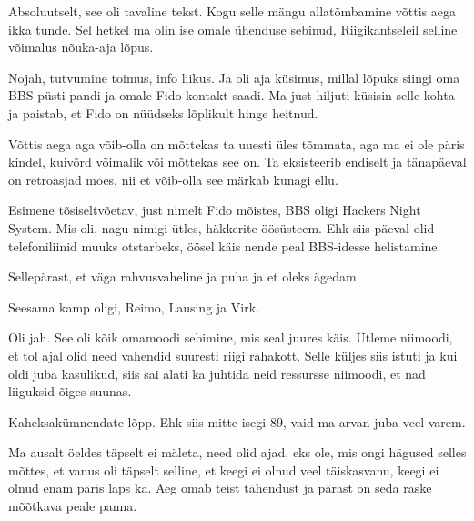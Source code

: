 
Absoluutselt, see oli tavaline tekst. Kogu selle mängu allatõmbamine võttis 
aega ikka tunde. Sel hetkel ma olin ise omale ühenduse sebinud, Riigikantseleil 
selline võimalus nõuka-aja lõpus. 

Nojah, tutvumine toimus, info liikus. Ja oli aja küsimus, millal lõpuks siingi  
oma BBS püsti pandi ja omale Fido kontakt saadi. Ma just hiljuti küsisin selle 
kohta ja paistab, et Fido on nüüdseks lõplikult hinge heitnud.


Võttis aega aga võib-olla on mõttekas ta uuesti üles tõmmata, aga ma ei ole 
päris kindel, kuivõrd võimalik või mõttekas see on. Ta eksisteerib endiselt ja 
tänapäeval on retroasjad moes, nii et võib-olla see märkab kunagi ellu.
                 

Esimene tõsiseltvõetav, just nimelt Fido mõistes, BBS oligi Hackers Night 
System. Mis oli, nagu 
nimigi ütles, häkkerite öösüsteem. Ehk siis päeval olid telefoniliinid muuks 
otstarbeks, öösel käis nende peal BBS-idesse helistamine. 


Sellepärast, et väga rahvusvaheline ja puha ja et oleks ägedam.

Seesama kamp oligi, Reimo, Lausing 
 ja Virk.
 
      

Oli jah. See oli kõik omamoodi sebimine, mis seal juures käis. Ütleme niimoodi, 
et tol ajal olid need vahendid suuresti riigi rahakott. Selle küljes siis 
istuti ja kui oldi juba kasulikud, siis sai alati ka juhtida neid ressursse 
niimoodi, et nad liiguksid õiges suunas. 


Kaheksakümnendate lõpp. Ehk siis mitte isegi 89, vaid ma arvan juba veel varem.
                 
Ma ausalt öeldes täpselt ei mäleta, need olid ajad, eks ole, mis ongi  hägused 
selles mõttes, et vanus oli täpselt selline, et keegi ei olnud veel  täiskasvanu, 
keegi ei olnud enam päris laps ka. Aeg omab teist tähendust ja pärast on seda 
raske mõõtkava peale panna.

